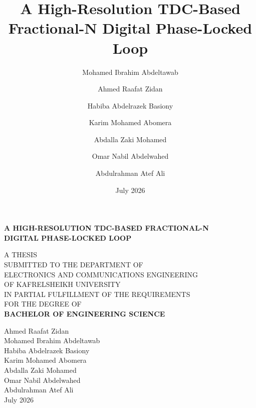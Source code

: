 \documentclass[12pt, twoside]{book}
\title{A High-Resolution TDC-Based Fractional-N Digital Phase-Locked Loop}
\author{
    Mohamed Ibrahim Abdeltawab \and
    Ahmed Raafat Zidan \and
    Habiba Abdelrazek Basiony \and
    Karim Mohamed Abomera \and
    Abdalla Zaki Mohamed \and
    Omar Nabil Abdelwahed \and
    Abdulrahman Atef Ali
}
\date{July 2026}
\begin{document}
\begin{titlepage}
    \begin{center}
        \vspace*{2cm}

        {\Large\bfseries
        A HIGH-RESOLUTION TDC-BASED FRACTIONAL-N\\[6pt]
        DIGITAL PHASE-LOCKED LOOP
        \par}

        \vspace{1.5cm}

        {\normalsize
        A THESIS\\[6pt]
        SUBMITTED TO THE DEPARTMENT OF\\
        ELECTRONICS AND COMMUNICATIONS ENGINEERING\\
        OF KAFRELSHEIKH UNIVERSITY\\[6pt]
        IN PARTIAL FULFILLMENT OF THE REQUIREMENTS\\
        FOR THE DEGREE OF\\[6pt]
        \textbf{BACHELOR OF ENGINEERING SCIENCE}
        \par}

        \vfill

        {\normalsize
        Ahmed Raafat Zidan\\
        Mohamed Ibrahim Abdeltawab\\
        Habiba Abdelrazek Basiony\\
        Karim Mohamed Abomera\\
        Abdalla Zaki Mohamed\\
        Omar Nabil Abdelwahed\\
        Abdulrahman Atef Ali\\[4pt]
        July 2026
        \par}

        \vspace{2cm}
    \end{center}
\end{titlepage}

\frontmatter
\pagestyle{plain}
\end{document}
